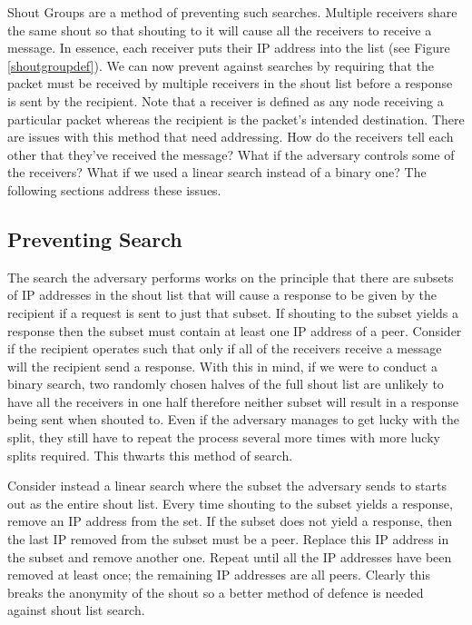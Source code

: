 \documentclass[ %
                    author={Luke Murray},
                supervisor={Dr. Simon Hollis},
                     title={Shadow Peer-to-Peer Networks},
                  subtitle={},
                    degree={MEng},
                      year={2013} ]{thesis}
\begin{document}
Shout Groups are a method of preventing such searches. Multiple receivers share the same shout so that shouting to it will cause all the receivers to receive a message. In essence, each receiver puts their IP address into the list (see Figure \ref{shoutgroupdef}). We can now prevent against searches by requiring that the packet must be received by multiple receivers in the shout list before a response is sent by the recipient. Note that a receiver is defined as any node receiving a particular packet whereas the recipient is the packet's intended destination. There are issues with this method that need addressing. How do the receivers tell each other that they've received the message? What if the adversary controls some of the receivers? What if we used a linear search instead of a binary one? The following sections address these issues.

\subsection{Preventing Search}

The search the adversary performs works on the principle that there are subsets of IP addresses in the shout list that will cause a response to be given by the recipient if a request is sent to just that subset. If shouting to the subset yields a response then the subset must contain at least one IP address of a peer. Consider if the recipient operates such that only if all of the receivers receive a message will the recipient send a response. With this in mind, if we were to conduct a binary search, two randomly chosen halves of the full shout list are unlikely to have all the receivers in one half therefore neither subset will result in a response being sent when shouted to. Even if the adversary manages to get lucky with the split, they still have to repeat the process several more times with more lucky splits required. This thwarts this method of search.

Consider instead a linear search where the subset the adversary sends to starts out as the entire shout list. Every time shouting to the subset yields a response, remove an IP address from the set. If the subset does not yield a response, then the last IP removed from the subset must be a peer. Replace this IP address in the subset and remove another one. Repeat until all the IP addresses have been removed at least once; the remaining IP addresses are all peers. Clearly this breaks the anonymity of the shout so a better method of defence is needed against shout list search.
\end{document}
